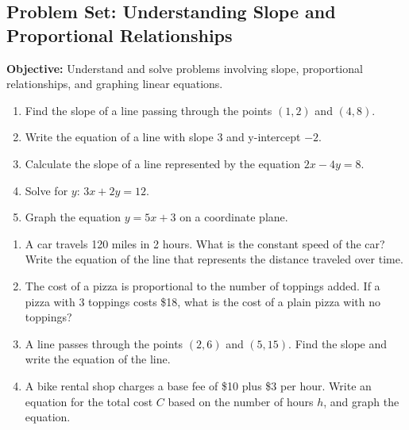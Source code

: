 \documentclass[12pt]{article}
\title{}
\date{}
\begin{document}
\onehalfspacing %

\subsection*{Problem Set: Understanding Slope and Proportional Relationships}

\begin{tcolorbox}[colframe=black!40, colback=gray!5, 
coltitle=black, colbacktitle=black!20, fonttitle=\bfseries\Large, 
title=Learning Objective, halign title=center, left=5pt, right=5pt, top=5pt, bottom=15pt]
\textbf{Objective:} Understand and solve problems involving slope, proportional relationships, and graphing linear equations.
\end{tcolorbox}

\begin{tcolorbox}[colframe=black!60, colback=white, 
coltitle=black, colbacktitle=black!15, fonttitle=\bfseries\Large, 
title=Exercises, halign title=center, left=10pt, right=10pt, top=10pt, bottom=60pt]
\begin{enumerate}[itemsep=3em]
    \item Find the slope of a line passing through the points \( (1, 2) \) and \( (4, 8) \).
    \item Write the equation of a line with slope \(3\) and y-intercept \(-2\).
    \item Calculate the slope of a line represented by the equation \( 2x - 4y = 8 \).
    \item Solve for \(y\): \( 3x + 2y = 12 \).
    \item Graph the equation \( y = 5x + 3 \) on a coordinate plane.
\end{enumerate}
\end{tcolorbox}

\begin{tcolorbox}[colframe=black!60, colback=white, 
coltitle=black, colbacktitle=black!15, fonttitle=\bfseries\Large, 
title=Problems, halign title=center, left=10pt, right=10pt, top=10pt, bottom=60pt]
\begin{enumerate}[start=6, itemsep=3em]
    \item A car travels 120 miles in 2 hours. What is the constant speed of the car? Write the equation of the line that represents the distance traveled over time.
    \item The cost of a pizza is proportional to the number of toppings added. If a pizza with 3 toppings costs \$18, what is the cost of a plain pizza with no toppings?
    \item A line passes through the points \( (2, 6) \) and \( (5, 15) \). Find the slope and write the equation of the line.
    \item A bike rental shop charges a base fee of \$10 plus \$3 per hour. Write an equation for the total cost \(C\) based on the number of hours \(h\), and graph the equation.
\end{enumerate}
\end{tcolorbox}
\end{document}
